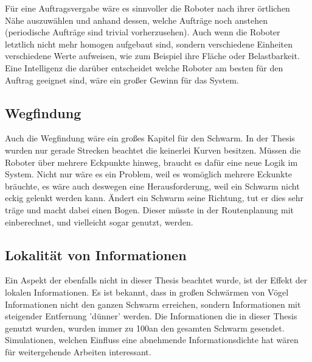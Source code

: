 Für eine Auftragsvergabe wäre es sinnvoller die Roboter nach ihrer örtlichen Nähe auszuwählen und anhand dessen, welche Aufträge noch anstehen (periodische Aufträge sind trivial vorherzusehen). Auch wenn die Roboter letztlich nicht mehr homogen aufgebaut sind, sondern verschiedene Einheiten verschiedene Werte aufweisen, wie zum Beispiel ihre Fläche oder Belastbarkeit. Eine Intelligenz die darüber entscheidet welche Roboter am besten für den Auftrag geeignet sind, wäre ein großer Gewinn für das System.

\subsection*{Wegfindung}

Auch die Wegfindung wäre ein großes Kapitel für den Schwarm. In der Thesis wurden nur gerade Strecken beachtet die keinerlei Kurven besitzen. Müssen die Roboter über mehrere Eckpunkte hinweg, braucht es dafür eine neue Logik im System. Nicht nur wäre es ein Problem, weil es womöglich mehrere Eckunkte bräuchte, es wäre auch deswegen eine Herausforderung, weil ein Schwarm nicht eckig gelenkt werden kann. Ändert ein Schwarm seine Richtung, tut er dies sehr träge und macht dabei einen Bogen. Dieser müsste in der Routenplanung mit einberechnet, und vielleicht sogar genutzt, werden.

\subsection*{Lokalität von Informationen}

Ein Aspekt der ebenfalls nicht in dieser Thesis beachtet wurde, ist der Effekt der lokalen Informationen. Es ist bekannt, dass in großen Schwärmen von Vögel Informationen nicht den ganzen Schwarm erreichen, sondern Informationen mit steigender Entfernung 'dünner' werden\cite{LocalInformation}. Die Informationen die in dieser Thesis genutzt wurden, wurden immer zu 100\per an den gesamten Schwarm gesendet. Simulationen, welchen Einfluss eine abnehmende Informationsdichte hat wären für weitergehende Arbeiten interessant.
